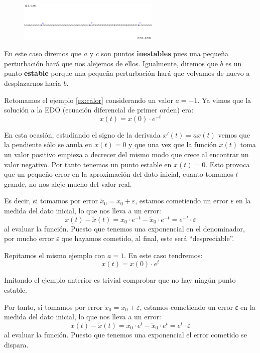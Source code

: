 \begin{figure}[hbtp]
\centering
\includegraphics[width = 0.6\textwidth]{img/diagrama-fases.png}
\end{figure}

En este caso diremos que $a$ y $c$ son puntos \textbf{inestables} pues una pequeña perturbación hará que nos alejemos de ellos. Igualmente, diremos que $b$ es un punto \textbf{estable} porque una pequeña perturbación hará que volvamos de nuevo a desplazarnos hacia $b$.

\begin{example}
Retomamos el ejemplo \ref{ex:calor} considerando un valor $a=-1$. Ya vimos que la solución a la EDO (ecuación diferencial de primer orden) era:
\[x(t) = x(0)\cdot e^{-t}\]

En esta ocasión, estudiando el signo de la derivada $x'(t)=ax(t)$ vemos que la pendiente sólo se anula en $x(t)=0$ y que una vez que la función $x(t)$ toma un valor positivo empieza a decrecer del mismo modo que crece al encontrar un valor negativo. Por tanto tenemos un punto estable en $x(t)=0$. Esto provoca que un pequeño error en la aproximación del dato inicial, cuanto tomamos $t$ grande, no nos aleje mucho del valor real.

Es decir, si tomamos por error $\tilde{x}_0 = x_0 + ε$, estamos cometiendo un error ε en la medida del dato inicial, lo que nos lleva a un error:
\[x(t)-\tilde{x}(t) = x_0\cdot e^{-t} - \tilde{x}_0\cdot e^{-t} = e^{-t}\cdot ε\]
al evaluar la función. Puesto que tenemos una exponencial en el denominador, por mucho error ε que hayamos cometido, al final, este será ``despreciable''.
\end{example}

\begin{example}
Repitamos el mismo ejemplo con $a=1$. En este caso tendremos:
\[x(t) = x(0)\cdot e^{t}\]

Imitando el ejemplo anterior es trivial comprobar que no hay ningún punto estable.

Por tanto, si tomamos por error $\tilde{x}_0 = x_0 + ε$, estamos cometiendo un error ε en la medida del dato inicial, lo que nos lleva a un error:
\[x(t)-\tilde{x}(t) = x_0\cdot e^{t} - \tilde{x}_0\cdot e^{t} = e^{t}\cdot ε\]
al evaluar la función. Puesto que tenemos una exponencial el error cometido se dispara.
\end{example}

